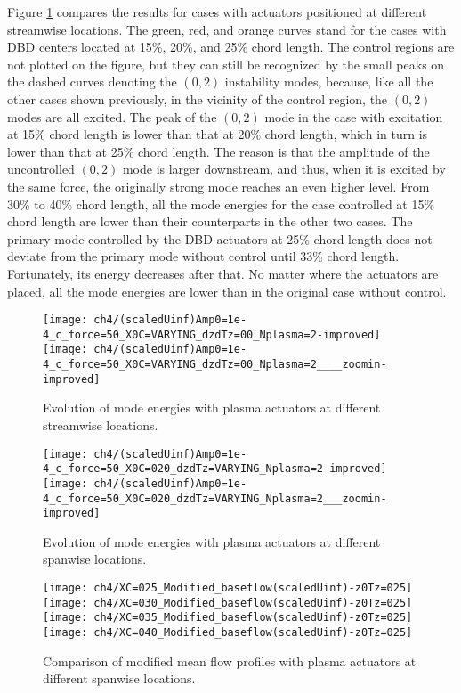 Figure \ref{f:streamwiselocationeffect} compares the results for cases with actuators positioned at different streamwise locations. The green, red, and orange curves stand for the cases with DBD centers located at 15\%, 20\%, and 25\% chord length. The control regions are not plotted on the figure, but they can still  be recognized by the small peaks on the dashed curves denoting the $(0,2)$ instability modes, because, like all the other cases shown previously, in the vicinity of the control region, the $(0,2)$ modes are all excited. The peak of the $(0,2)$ mode in the case with excitation at 15\% chord length is lower than that at 20\% chord length, which in turn is lower than that at 25\% chord length. The reason is that the amplitude of the uncontrolled $(0,2)$ mode is larger  downstream, and thus, when it is excited by the same force, the originally strong mode reaches an even higher level. From 30\% to 40\% chord length, all the mode energies for the case controlled at 15\% chord length are lower than their counterparts in the other two cases. The primary mode controlled by the DBD actuators at 25\% chord length does not deviate from the primary mode without control until 33\% chord length. Fortunately, its energy decreases after that. No matter where the actuators are placed, all the mode energies are lower than in the original case without control.
\begin{figure}
\centering
\texttt{[image: ch4/(scaledUinf)Amp0=1e-4\_c\_force=50\_X0C=VARYING\_dzdTz=00\_Nplasma=2-improved]}
\texttt{[image: ch4/(scaledUinf)Amp0=1e-4\_c\_force=50\_X0C=VARYING\_dzdTz=00\_Nplasma=2\_\_\_\_zoomin-improved]}
\caption{Evolution of mode energies with plasma actuators at different streamwise locations.}%
\label{f:streamwiselocationeffect}
\end{figure}
\begin{figure}
\centering
\texttt{[image: ch4/(scaledUinf)Amp0=1e-4\_c\_force=50\_X0C=020\_dzdTz=VARYING\_Nplasma=2-improved]}
\texttt{[image: ch4/(scaledUinf)Amp0=1e-4\_c\_force=50\_X0C=020\_dzdTz=VARYING\_Nplasma=2\_\_\_zoomin-improved]}
\caption{Evolution of mode energies with plasma actuators at different spanwise locations.}%
\label{f:spanwiselocationeffect}
\end{figure}
\begin{figure}
\centering
\texttt{[image: ch4/XC=025\_Modified\_baseflow(scaledUinf)-z0Tz=025]}
\texttt{[image: ch4/XC=030\_Modified\_baseflow(scaledUinf)-z0Tz=025]}
\texttt{[image: ch4/XC=035\_Modified\_baseflow(scaledUinf)-z0Tz=025]}
\texttt{[image: ch4/XC=040\_Modified\_baseflow(scaledUinf)-z0Tz=025]}
\caption{Comparison of modified mean flow profiles with plasma actuators  at different spanwise locations.}%
\label{f:Wt_SpVar}
\end{figure}

